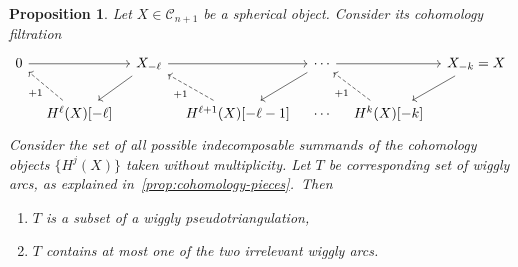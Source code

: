 \documentclass{amsart}
\newtheorem{proposition}[theorem]{Proposition}
\theoremstyle{definition}
\begin{document}
\begin{proposition}
\label{prop:hn-filtration}
  Let \(X \in \mathcal{C}_{n+1}\) be a spherical object.
  Consider its cohomology filtration
  \[
    \begin{tikzcd}[column sep=0.3cm]
      0 \arrow{rr} && X_{-\ell} \arrow{dl} \arrow{rr} && \cdots \arrow{rr} \arrow{dl} && X_{-k} = X \arrow{dl}\\
      & H^\ell(X)[-\ell] \arrow[dashed]{ul}{+1} && H^{\ell+1}(X)[-\ell-1] \arrow[dashed]{ul}{+1} & \cdots & H^k(X)[-k] \arrow[dashed]{ul}{+1}
    \end{tikzcd}
  \]
  Consider the set of all possible indecomposable summands of the cohomology objects \(\{H^j(X)\}\) taken without multiplicity.
  Let \(T\) be corresponding set of wiggly arcs, as explained in~\cref{prop:cohomology-pieces}.~Then
  \begin{enumerate}
  \item 
    \(T\) is a subset of a wiggly pseudotriangulation,
  \item \(T\) contains at most one of the two irrelevant wiggly arcs.
  \end{enumerate}
\end{proposition}
\end{document}
